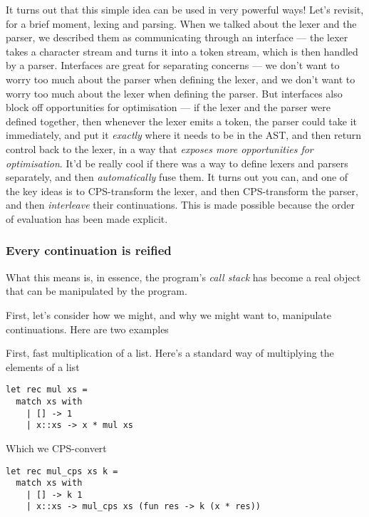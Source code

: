 It turns out that this simple idea can be used in very powerful ways! Let's revisit, for a brief moment, lexing and parsing. When we talked about the lexer and the parser, we described them as communicating through an interface --- the lexer takes a character stream and turns it into a token stream, which is then handled by a parser. Interfaces are great for separating concerns --- we don't want to worry too much about the parser when defining the lexer, and we don't want to worry too much about the lexer when defining the parser. But interfaces also block off opportunities for optimisation --- if the lexer and the parser were defined together, then whenever the lexer emits a token, the parser could take it immediately, and put it \emph{exactly} where it needs to be in the AST, and then return control back to the lexer, in a way that \textit{exposes more opportunities for optimisation}. It'd be really cool if there was a way to define lexers and parsers separately, and then \emph{automatically} fuse them. It turns out you can, and one of the key ideas is to CPS-transform the lexer, and then CPS-transform the parser, and then \emph{interleave} their continuations. This is made possible because the order of evaluation has been made explicit. 

\subsubsection{Every continuation is reified}
What this means is, in essence, the program's \emph{call stack} has become a real object that can be manipulated by the program. 

First, let's consider how we might, and why we might want to, manipulate continuations. Here are two examples

First, fast multiplication of a list. Here's a standard way of multiplying the elements of a list 

\begin{code}
\label{code:mul-ocaml}
\begin{verbatim}
let rec mul xs = 
  match xs with
    | [] -> 1
    | x::xs -> x * mul xs
\end{verbatim}
\end{code}

Which we CPS-convert

\begin{code}
\label{code:mul-ocaml-fast}
\begin{verbatim}
let rec mul_cps xs k = 
  match xs with
    | [] -> k 1
    | x::xs -> mul_cps xs (fun res -> k (x * res))
\end{verbatim}
\end{code}

